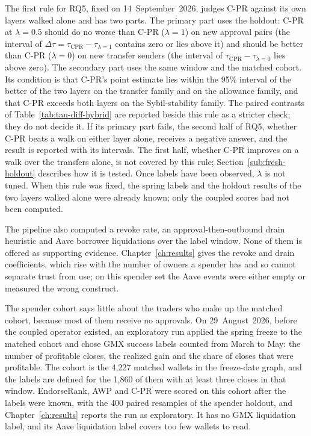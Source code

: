 The first rule for RQ5, fixed on 14~September~2026, judges C-PR against its own layers walked alone and has two parts. The primary part uses the holdout: C-PR at $\lambda=0.5$ should do no worse than C-PR ($\lambda=1$) on new approval pairs (the interval of $\Delta\tau=\tau_{\mathrm{CPR}}-\tau_{\lambda=1}$ contains zero or lies above it) and should be better than C-PR ($\lambda=0$) on new transfer senders (the interval of $\tau_{\mathrm{CPR}}-\tau_{\lambda=0}$ lies above zero). The secondary part uses the same window and the matched cohort. Its condition is that C-PR's point estimate lies within the 95\% interval of the better of the two layers on the transfer family and on the allowance family, and that C-PR exceeds both layers on the Sybil-stability family. The paired contrasts of Table~\ref{tab:tau-diff-hybrid} are reported beside this rule as a stricter check; they do not decide it. If its primary part fails, the second half of RQ5, whether C-PR beats a walk on either layer alone, receives a negative answer, and the result is reported with its intervals. The first half, whether C-PR improves on a walk over the transfers alone, is not covered by this rule; Section~\ref{sub:fresh-holdout} describes how it is tested. Once labels have been observed, $\lambda$ is not tuned. When this rule was fixed, the spring labels and the holdout results of the two layers walked alone were already known; only the coupled scores had not been computed.

The pipeline also computed a revoke rate, an approval-then-outbound drain heuristic and Aave borrower liquidations over the label window. None of them is offered as supporting evidence. Chapter~\ref{ch:results} gives the revoke and drain coefficients, which rise with the number of owners a spender has and so cannot separate trust from use; on this spender set the Aave events were either empty or measured the wrong construct.


The spender cohort says little about the traders who make up the matched cohort, because most of them receive no approvals. On 29~August~2026, before the coupled operator existed, an exploratory run applied the spring freeze to the matched cohort and chose GMX success labels counted from March to May: the number of profitable closes, the realized gain and the share of closes that were profitable. The cohort is the 4,227 matched wallets in the freeze-date graph, and the labels are defined for the 1,860 of them with at least three closes in that window. EndorseRank, AWP and C-PR were scored on this cohort after the labels were known, with the 400 paired resamples of the spender holdout, and Chapter~\ref{ch:results} reports the run as exploratory. It has no GMX liquidation label, and its Aave liquidation label covers too few wallets to read.

